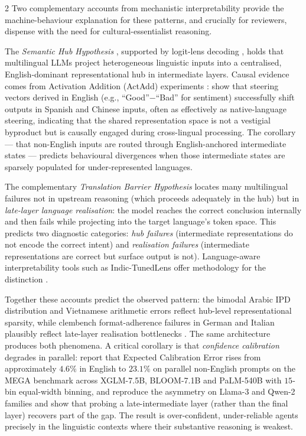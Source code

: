 \documentclass[openacc]{rsproca_new}
\begin{document}
\begin{multicols}{2}
Two complementary accounts from mechanistic interpretability provide the machine-behaviour explanation for these patterns, and crucially for reviewers, dispense with the need for cultural-essentialist reasoning.

The \emph{Semantic Hub Hypothesis} \cite{wu2024semantichub}, supported by logit-lens decoding \cite{wendler2024llamasenglish}, holds that multilingual LLMs project heterogeneous linguistic inputs into a centralised, English-dominant representational hub in intermediate layers. Causal evidence comes from Activation Addition (ActAdd) experiments \cite{turner2023actadd}: \citeauthor{wu2024semantichub} \cite{wu2024semantichub} show that steering vectors derived in English (e.g., ``Good''$-$``Bad'' for sentiment) successfully shift outputs in Spanish and Chinese inputs, often as effectively as native-language steering, indicating that the shared representation space is not a vestigial byproduct but is causally engaged during cross-lingual processing. The corollary --- that non-English inputs are routed through English-anchored intermediate states --- predicts behavioural divergences when those intermediate states are sparsely populated for under-represented languages.

The complementary \emph{Translation Barrier Hypothesis} \cite{bafna2025translationbarrier} locates many multilingual failures not in upstream reasoning (which proceeds adequately in the hub) but in \emph{late-layer language realisation}: the model reaches the correct conclusion internally and then fails while projecting into the target language's token space. This predicts two diagnostic categories: \emph{hub failures} (intermediate representations do not encode the correct intent) and \emph{realisation failures} (intermediate representations are correct but surface output is not). Language-aware interpretability tools such as Indic-TunedLens offer methodology for the distinction \cite{kumar2025indictunedlens}.

Together these accounts predict the observed pattern: the bimodal Arabic IPD distribution and Vietnamese arithmetic errors reflect hub-level representational sparsity, while clembench format-adherence failures in German and Italian plausibly reflect late-layer realisation bottlenecks \cite{beyer2024clembench, schlangen2025clembench}. The same architecture produces both phenomena. A critical corollary is that \emph{confidence calibration} degrades in parallel: \citeauthor{ahuja2022calibration} \cite{ahuja2022calibration} report that Expected Calibration Error rises from approximately $4.6\%$ in English to $23.1\%$ on parallel non-English prompts on the MEGA benchmark across XGLM-7.5B, BLOOM-7.1B and PaLM-540B with $15$-bin equal-width binning, and \citeauthor{zhou2025beyond} \cite{zhou2025beyond} reproduce the asymmetry on Llama-3 and Qwen-2 families and show that probing a late-intermediate layer (rather than the final layer) recovers part of the gap. The result is over-confident, under-reliable agents precisely in the linguistic contexts where their substantive reasoning is weakest.


\end{multicols}
\end{document}

